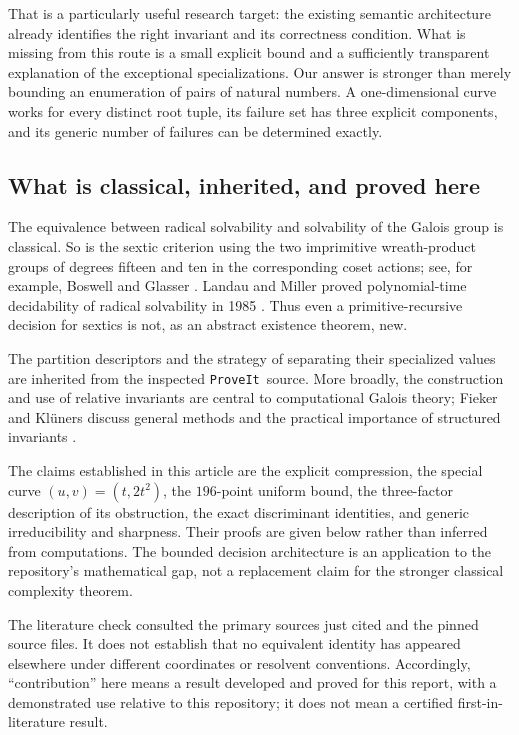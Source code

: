 \documentclass[11pt,letterpaper]{article}
\numberwithin{equation}{section}
\theoremstyle{definition}
\theoremstyle{remark}
\newcommand{\repo}{\texttt{ProveIt}}
\begin{document}
That is a particularly useful research target: the existing semantic
architecture already identifies the right invariant and its correctness
condition. What is missing from this route is a small explicit bound and a
sufficiently transparent explanation of the exceptional specializations.
Our answer is stronger than merely bounding an enumeration of pairs of
natural numbers. A one-dimensional curve works for every distinct root
tuple, its failure set has three explicit components, and its generic number
of failures can be determined exactly.

\subsection{What is classical, inherited, and proved here}

The equivalence between radical solvability and solvability of the Galois
group is classical. So is the sextic criterion using the two imprimitive
wreath-product groups of degrees fifteen and ten in the corresponding
coset actions; see, for example, Boswell and Glasser \cite{boswell-glasser}.
Landau and Miller proved polynomial-time decidability of radical solvability
in 1985 \cite{landau-miller}. Thus even a primitive-recursive decision for
sextics is not, as an abstract existence theorem, new.

The partition descriptors and the strategy of separating their specialized
values are inherited from the inspected \repo\ source. More broadly, the
construction and use of relative invariants are central to computational
Galois theory; Fieker and Kl\"uners discuss general methods and the practical
importance of structured invariants \cite{fieker-klueners}.

The claims established in this article are the explicit compression,
the special curve $(u,v)=(t,2t^2)$, the $196$-point uniform bound, the
three-factor description of its obstruction, the exact discriminant
identities, and generic irreducibility and sharpness. Their proofs are given
below rather than inferred from computations. The bounded decision
architecture is an application to the repository's mathematical gap, not a
replacement claim for the stronger classical complexity theorem.

The literature check consulted the primary sources just cited and the
pinned source files. It does not establish that no equivalent identity has
appeared elsewhere under different coordinates or resolvent conventions.
Accordingly, ``contribution'' here means a result developed and proved for
this report, with a demonstrated use relative to this repository; it does
not mean a certified first-in-literature result.
\end{document}
